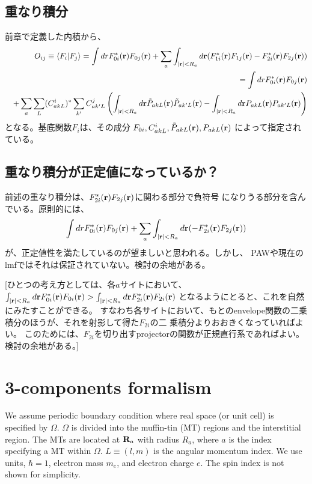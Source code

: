 \documentclass[a4paper,10pt,aip,onecolumn,amsmath,amssymb,floatfix,rmp]{revtex4-1}
\newcommand{\bfr}{{\bf r}}
\newcommand{\bfR}{{\bf R}}
\begin{document}
\subsection{重なり積分}
前章で定義した内積から、
\begin{eqnarray}
&&O_{ij} \equiv \langle F_i| F_j \rangle 
= \int dr F^*_{0i}(\bfr) F_{0j}(\bfr)  
+ \sum_a \int_{|\bfr| <R_a} d\bfr (F^{*}_{1i}(\bfr) F_{1j}(\bfr) - F^{*}_{2i}(\bfr) F_{2j}(\bfr)) \nonumber \\
&&= \int dr F^*_{0i}(\bfr) F_{0j}(\bfr)  \nonumber \\
&&+ \sum_a \sum_{L} (C^{i}_{akL})^* \sum_{k'} C^{j}_{ak'L}
\left(\int_{|\bfr| <R_a} d\bfr \tilde{P}_{akL}(\bfr) \tilde{P}_{ak'L}(\bfr)
-\int_{|\bfr| <R_a} d\bfr {P}_{akL}(\bfr) {P}_{ak'L}(\bfr) \right)
\label{eq:over}
\end{eqnarray}
となる。基底関数$F_{i}$は、その成分
$F_{0i},C^i_{akL},\tilde{P}_{akL}(\bfr),{P}_{akL}(\bfr)$
によって指定されている。


\subsection{重なり積分が正定値になっているか？}
前述の重なり積分は、$F^{*}_{2i}(\bfr) F_{2j}(\bfr)$に関わる部分で負符号
になりうる部分を含んでいる。原則的には、
\begin{eqnarray}
\int dr F^*_{0i}(\bfr) F_{0j}(\bfr)  
+ \sum_a \int_{|\bfr| <R_a} d\bfr ( - F^{*}_{2i}(\bfr) F_{2j}(\bfr)) \nonumber 
\label{eq:over2}
\end{eqnarray}
が、正定値性を満たしているのが望ましいと思われる。しかし、
PAWや現在のlmfではそれは保証されていない。検討の余地がある。

{\small [ひとつの考え方としては、各$a$サイトにおいて、
$\int_{|\bfr| <R_a} d\bfr F^*_{0i}(\bfr) F_{0i}(\bfr)  
>\int_{|\bfr| <R_a} d\bfr F^{*}_{2i}(\bfr) F_{2i}(\bfr)$ 
となるようにとると、これを自然にみたすことができる。
すなわち各サイトにおいて、もとのenvelope関数の二乗積分のほうが、それを射影して得た$F_{2i}$の二
乗積分よりおおきくなっていればよい。
このためには、$F_{2i}$を切り出すprojectorの関数が正規直行系であればよい。
検討の余地がある。]}

\section{3-components formalism}
\label{sec:formalism}
We assume periodic boundary condition where
real space (or unit cell) is specified by $\Omega$.
$\Omega$ is divided into the muffin-tin (MT) regions and the interstitial region.
The MTs are located at $\bfR_a$ with radius $R_a$, where 
$a$ is the index specifying a MT within $\Omega$.
$L\equiv(l,m)$ is the angular momentum index.
We use units, $\hbar=1$, electron mass $m_e$, and electron charge $e$. 
The spin index is not shown for simplicity.
\end{document}
